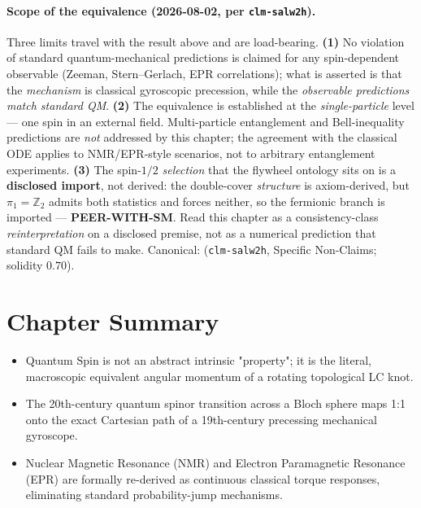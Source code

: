\paragraph{Scope of the equivalence (2026-08-02, per \texttt{clm-salw2h}).}
Three limits travel with the result above and are load-bearing. \textbf{(1)} No violation of
standard quantum-mechanical predictions is claimed for any spin-dependent observable (Zeeman,
Stern--Gerlach, EPR correlations); what is asserted is that the \emph{mechanism} is classical
gyroscopic precession, while the \emph{observable predictions match standard QM}. \textbf{(2)} The
equivalence is established at the \emph{single-particle} level --- one spin in an external field.
Multi-particle entanglement and Bell-inequality predictions are \emph{not} addressed by this
chapter; the agreement with the classical ODE applies to NMR/EPR-style scenarios, not to arbitrary
entanglement experiments. \textbf{(3)} The spin-$1/2$ \emph{selection} that the flywheel ontology
sits on is a \textbf{disclosed import}, not derived: the double-cover \emph{structure} is
axiom-derived, but $\pi_1 = \mathbb{Z}_2$ admits both statistics and forces neither, so the
fermionic branch is imported --- \textbf{PEER-WITH-SM}. Read this chapter as a
consistency-class \emph{reinterpretation} on a disclosed premise, not as a numerical prediction that
standard QM fails to make. Canonical:  (\texttt{clm-salw2h},
Specific Non-Claims; solidity $0.70$).

\section*{Chapter Summary}
\begin{itemize}
    \item Quantum Spin is not an abstract intrinsic "property"; it is the literal, macroscopic equivalent angular momentum of a rotating topological LC knot.
    \item The 20th-century quantum spinor transition across a Bloch sphere maps 1:1 onto the exact Cartesian path of a 19th-century precessing mechanical gyroscope.
    \item Nuclear Magnetic Resonance (NMR) and Electron Paramagnetic Resonance (EPR) are formally re-derived as continuous classical torque responses, eliminating standard probability-jump mechanisms.
\end{itemize}

